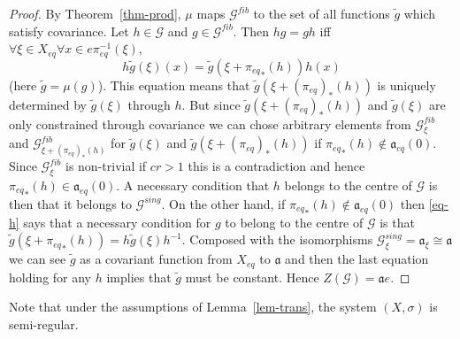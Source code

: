 \documentclass[12pt]{amsart}
\theoremstyle{definition}
\numberwithin{equation}{section}
\newcommand{\Gg}{{\mathcal G}}
\newcommand{\Xe}{X_{eq}}
\newcommand{\aut}{{\mathfrak a}}
\newcommand{\aute}{\aut_{eq}}
\newcommand{\pe}{\pi_{eq}}
\newcommand{\Gf}{\Gg^{fib}}
\begin{document}
\begin{proof}
By Theorem~\ref{thm-prod}, $\mu$ maps $\Gf$ to the set of  
all functions $\tilde g$ which satisfy covariance. 
Let $h\in \Gg$ and $g\in \Gf$. Then $h g = g h$ iff 
$\forall \xi\in \Xe \forall x\in e\pe^{-1}(\xi)$, 
\begin{equation}\label{eq-h} 
h \tilde g(\xi)(x) =\tilde g(\xi+{\pe}_*(h)) h(x)
\end{equation} 
(here $\tilde g = \mu(g)$).
This equation means that $\tilde g(\xi+(\pe)_*(h))$ is uniquely determined by $\tilde g(\xi)$ through $h$. But since  $\tilde g(\xi+(\pe)_*(h))$ and $\tilde g(\xi)$ are only constrained through covariance we can chose arbitrary elements from $\Gf_\xi$ and $\Gf_{\xi+(\pe)_*(h)}$ for   $\tilde g(\xi)$ and $\tilde g(\xi+(\pe)_*(h))$ if ${\pe}_*(h)\notin \aute (0)$. Since $\Gf_\xi$ is non-trivial if $cr>1$ this is a contradiction and hence 
${\pe}_*(h)\in \aute (0)$. A necessary condition that $h$ belongs to the centre of $\Gg$ is then that it belongs to $\Gg^{sing}$.  
On the other hand, if ${\pe}_*(h)\notin \aute (0)$ then  \eqref{eq-h} says that a necessary condition for $g$ to belong to the centre of $\Gg$ is that 
$\tilde g(\xi+{\pe}_*(h))=h\tilde g(\xi)h^{-1}$. Composed with the isomorphisms $\Gg^{sing}_\xi=\aut_\xi\cong\aut$ we can see $\tilde g$ as a covariant function from $\Xe$ to $\aut$ and then the last equation holding for any $h$ implies that $\tilde g$ must be constant. Hence $Z(\Gg)=\aut e$.
\end{proof}
Note that under the assumptions of Lemma~\ref{lem-trans},  the system $(X,\sigma)$ is semi-regular.
 
\end{document}
